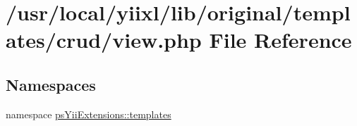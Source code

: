 \hypertarget{crud_2view_8php}{
\section{/usr/local/yiixl/lib/original/templates/crud/view.php File Reference}
\label{crud_2view_8php}
}
\subsection*{Namespaces}
\begin{DoxyCompactItemize}
\item 
namespace \hyperlink{namespacepsYiiExtensions_1_1templates}{psYiiExtensions::templates}
\end{DoxyCompactItemize}
